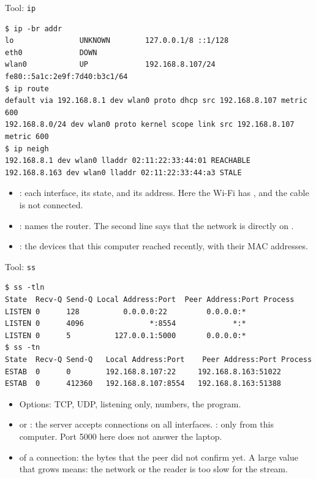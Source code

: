 \begin{frame}[fragile]{Tool: \texttt{ip}}
\begin{lstlisting}[style=shell, basicstyle=\ttfamily\scriptsize]
$ ip -br addr
lo               UNKNOWN        127.0.0.1/8 ::1/128
eth0             DOWN
wlan0            UP             192.168.8.107/24 fe80::5a1c:2e9f:7d40:b3c1/64
$ ip route
default via 192.168.8.1 dev wlan0 proto dhcp src 192.168.8.107 metric 600
192.168.8.0/24 dev wlan0 proto kernel scope link src 192.168.8.107 metric 600
$ ip neigh
192.168.8.1 dev wlan0 lladdr 02:11:22:33:44:01 REACHABLE
192.168.8.163 dev wlan0 lladdr 02:11:22:33:44:a3 STALE
\end{lstlisting}
  \small
  \begin{itemize}
    \item {}: each interface, its state, and its address.
          Here the Wi-Fi  has , and the
          cable  is not connected.
    \item {}:  names the router. The second
          line says that the network  is directly on
          .
    \item {}: the devices that this computer reached recently,
          with their MAC addresses.
  \end{itemize}
\end{frame}

\begin{frame}[fragile]{Tool: \texttt{ss}}
\begin{lstlisting}[style=shell, basicstyle=\ttfamily\scriptsize]
$ ss -tln
State  Recv-Q Send-Q Local Address:Port  Peer Address:Port Process
LISTEN 0      128          0.0.0.0:22         0.0.0.0:*
LISTEN 0      4096               *:8554             *:*
LISTEN 0      5          127.0.0.1:5000       0.0.0.0:*
$ ss -tn
State  Recv-Q Send-Q   Local Address:Port    Peer Address:Port Process
ESTAB  0      0        192.168.8.107:22     192.168.8.163:51022
ESTAB  0      412360   192.168.8.107:8554   192.168.8.163:51388
\end{lstlisting}
  \small
  \begin{itemize}
    \item Options:  TCP,  UDP,  listening only,
           numbers,  the program.
    \item {} or \code{*}: the server accepts connections on
          all interfaces. : only from this computer. Port
          5000 here does not answer the laptop.
    \item {} of a connection: the bytes that the peer did not
          confirm yet. A large value that grows means: the network or the
          reader is too slow for the stream.
  \end{itemize}
\end{frame}

